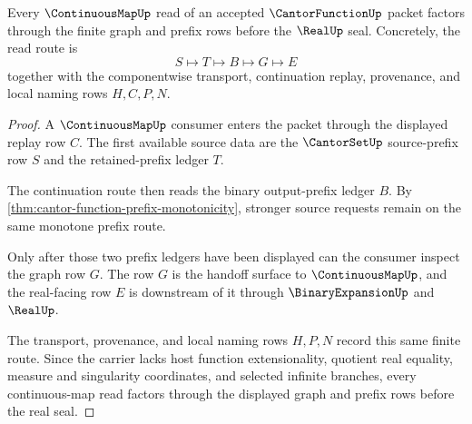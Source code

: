 \begin{theorem}
\label{thm:cantor-function-continuous-map-handoff}
Every $\ContinuousMapUp$ read of an accepted $\CantorFunctionUp$ packet factors through the finite graph and prefix rows before the $\RealUp$ seal. Concretely, the read route is
$$
S \longmapsto T \longmapsto B \longmapsto G \longmapsto E
$$
together with the componentwise transport, continuation replay, provenance, and local naming rows $H,C,P,N$.
\end{theorem}
\begin{proof}
A $\ContinuousMapUp$ consumer enters the packet through the displayed replay row $C$. The first available source data are the $\CantorSetUp$ source-prefix row $S$ and the retained-prefix ledger $T$.

The continuation route then reads the binary output-prefix ledger $B$. By \autoref{thm:cantor-function-prefix-monotonicity}, stronger source requests remain on the same monotone prefix route.

Only after those two prefix ledgers have been displayed can the consumer inspect the graph row $G$. The row $G$ is the handoff surface to $\ContinuousMapUp$, and the real-facing row $E$ is downstream of it through $\BinaryExpansionUp$ and $\RealUp$.

The transport, provenance, and local naming rows $H,P,N$ record this same finite route. Since the carrier lacks host function extensionality, quotient real equality, measure and singularity coordinates, and selected infinite branches, every continuous-map read factors through the displayed graph and prefix rows before the real seal.
\end{proof}


